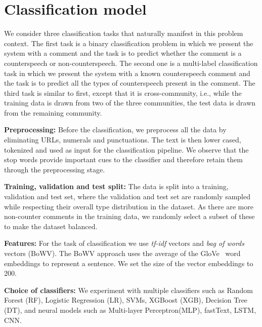 \documentclass[11pt,a4paper]{article}
\newcommand{\TODO}[1]{\textcolor{red}{#1}}
\newcommand{\binny}[1]{\textcolor{blue}{[Binny: #1]}}
\begin{document}
{\section{Classification model}
We consider three classification tasks that naturally manifest in this problem context. The first task is a binary classification problem in which we present the system with a comment and the task is to predict whether the comment is a counterspeech or non-counterspeech. The second one is a multi-label classification task in which we present the system with a known counterspeech comment and the task is to predict all the types of counterspeech present in the comment. The third task is similar to first, except that it is cross-community, i.e., while the training data is drawn from two of the three communities, the test data is drawn from the remaining community. 

\noindent\textbf{Preprocessing:} Before the classification, we preprocess all the data by eliminating URLs, numerals and punctuations. The text is then lower cased, tokenized and used as input for the classification pipeline. We observe that the stop words provide important cues to the classifier and therefore retain them through the preprocessing stage.

\noindent\textbf{Training, validation and test split:} The data is split into a training, validation and test set, where the validation and test set are randomly sampled while respecting their overall type distribution in the dataset. \iffalse \TODO{PG: What do you mean by the last sentence? Each type is not equally distributed in general.}\binny{I wanted the train, test and validation set to have the same percentage of each class. The validation set(5\%of data) will have at least 5\%( as comments can have more than one category) of each category of comments. Then Test set will have at least 20\% of each category. The rest is used as Training Data.}\fi As there are more non-counter comments in the training data, we randomly select a subset of these to make the dataset balanced. 



\noindent\textbf{Features:} For the task of classification we use \textit{tf-idf} vectors and \textit{bag of words} vectors (BoWV). The BoWV approach uses the average of the GloVe~\cite{pennington2014glove} word embeddings to represent a sentence. We set the size of the vector embeddings to 200.

\noindent\textbf{Choice of classifiers:}
We experiment with multiple classifiers such as Random Forest (RF), Logistic Regression (LR), SVMs, XGBoost (XGB), Decision Tree (DT), and neural models such as Multi-layer Perceptron(MLP), fastText, LSTM, CNN. 


}
\end{document}
